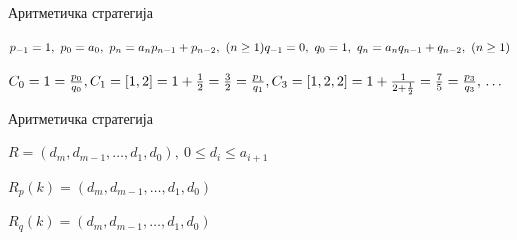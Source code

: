 \documentclass[10pt]{beamer}
\newcommand{\examplebox}[2]{
\begin{tcolorbox}[colframe=darkcardinal,colback=boxgray,title=#1]
#2
\end{tcolorbox}}
\DeclareMathOperator{\comma}{,}
\DeclareMathOperator{\equal}{=}
\DeclareMathOperator{\leftbracket}{[}
\DeclareMathOperator{\rightbracket}{]}
\begin{document}
	
	\begin{frame}{Аритметичка стратегија}
		\begin{tcolorbox}
			[title=Нека је $ \leftbracket a_{0}\comma a_{1}\comma a_{2}\comma \ldots \rightbracket $ верижни развој броја $ \alpha $ и за низове $ p_{n} $ и $ q_{n} $ (бројилаца и именилаца конвергената) важи следећа рекурентна релација:]
				$ p_{-1} = 1,\ p_{0} = a_{0},\ p_{n} = a_{n}p_{n-1} + p_{n-2},\ (n \geq 1 )\\
				q_{-1} = 0,\ q_{0} = 1,\ q_{n} = a_{n}q_{n-1} + q_{n-2},\ (n \geq 1 ) $
		\end{tcolorbox}
	
		\examplebox{Нека је верижни развој броја $ \alpha \equal \leftbracket 1\comma 2\comma 2 \ldots \rightbracket \equal 1 + \frac{1}{2 + \frac{1}{2 + \ldots}} $ чији су конвергенти:}
		{$ 	C_{0} = 1 = \frac{p_{0}}{q_{0}},\\ 
			C_{1} = [1, 2] = 1 + \frac{1}{2} = \frac{3}{2} = \frac{p_{1}}{q_{1}},\\ 
			C_{3} = [1, 2, 2] = 1 + \frac{1}{2 + \frac{1}{2}} = \frac{7}{5} = \frac{p_{3}}{q_{3}},\\ \ldots $}	
	\end{frame}
	
	\begin{frame}{Аритметичка стратегија}
		\begin{tcolorbox}[title=Репрезентација $ R $ је:]
			$ R = (d_{m}, d_{m-1}, \ldots , d_{1}, d_{0}), \ 0 \leq d_{i} \leq a_{i+1} $
		\end{tcolorbox}
		\begin{tcolorbox}[title=$ p $-репрезентација $ R_{p} $ броја $ k $ је:]
			$ R_{p}(k) = (d_{m}, d_{m-1}, \ldots , d_{1}, d_{0}) $
		\end{tcolorbox}
		\begin{tcolorbox}[title=$ q $-репрезентација $ R_{q} $ броја $ k $ је:]
			$ R_{q}(k) = (d_{m}, d_{m-1}, \ldots , d_{1}, d_{0}) $
		\end{tcolorbox}
	\end{frame}
	
\end{document}
